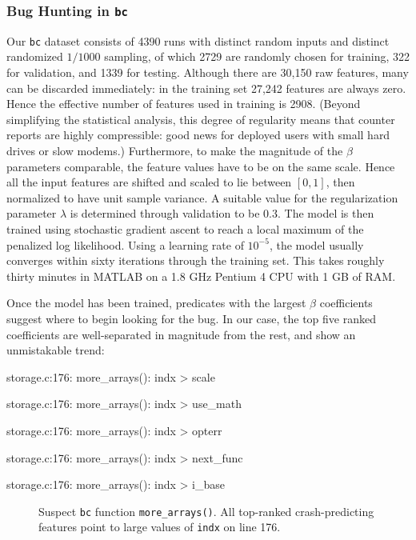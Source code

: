 \subsubsection{Bug Hunting in \texttt{bc}}

Our \texttt{bc} dataset consists of 4390 runs with distinct random
inputs and distinct randomized $1/1000$ sampling, of which 2729 are
randomly chosen for training, 322 for validation, and 1339 for
testing.  Although there are 30,150 raw features, many can be
discarded immediately: in the training set 27,242 features are always
zero.  Hence the effective number of features used in training is
2908.  (Beyond simplifying the statistical analysis, this degree of
regularity means that counter reports are highly compressible: good
news for deployed users with small hard drives or slow modems.)
Furthermore, to make the magnitude of the $\beta$ parameters comparable,
the feature values have to be on the same scale.  Hence all the input
features are shifted and scaled to lie between $[0,1]$, then
normalized to have unit sample variance.  A suitable value for the
regularization parameter $\lambda$ is determined through validation to be
$0.3$.  The model is then trained using stochastic gradient ascent to
reach a local maximum of the penalized log likelihood.  Using a
learning rate of $10^{-5}$, the model usually converges within sixty
iterations through the training set.  This takes roughly thirty
minutes in MATLAB on a 1.8 GHz Pentium 4 CPU with 1 GB of RAM.

Once the model has been trained, predicates with the largest $\beta$
coefficients suggest where to begin looking for the bug.  In our case,
the top five ranked coefficients are well-separated in magnitude from
the rest, and show an unmistakable trend:

\begin{list}{.}{\setlength{\itemsep}{0pt}\setlength{\parsep}{0in}\ttfamily\small}
\item storage.c:176: more\_arrays(): indx > scale
\item storage.c:176: more\_arrays(): indx > use\_math
\item storage.c:176: more\_arrays(): indx > opterr
\item storage.c:176: more\_arrays(): indx > next\_func
\item storage.c:176: more\_arrays(): indx > i\_base
\end{list}

\begin{figure}
  \centering
  \small
  \caption{Suspect \texttt{bc} function \texttt{more\_arrays()}.  All
  top-ranked crash-predicting features point to large values of
  \texttt{indx} on line 176.}
  \label{fig:bc:more-arrays}
\end{figure}


